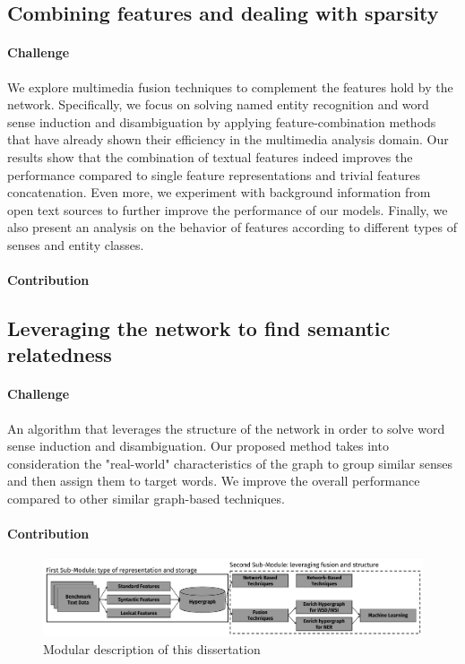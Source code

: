 \subsection{Combining features and dealing with sparsity}
\paragraph{Challenge}

 We explore multimedia fusion techniques to complement the features hold by the network. Specifically, we focus on solving named entity recognition and word sense induction and disambiguation by applying feature-combination methods that have already shown their efficiency in the multimedia analysis domain.  Our results show that the combination of textual features indeed improves the performance compared to single feature representations and trivial features concatenation. Even more, we experiment with background information from open text sources to further improve the performance of our models. Finally, we also present an analysis on the behavior of features according to different types of senses and entity classes.



\paragraph{Contribution}
\newpage
\subsection{Leveraging the network to find semantic relatedness}
\paragraph{Challenge}
An algorithm that leverages  the structure of the network in order to solve word sense induction and disambiguation. Our proposed method takes into consideration the "real-world" characteristics of the graph to group similar senses and then assign them to target words. We  improve the overall performance compared to other similar graph-based techniques.

\paragraph{Contribution}






\begin{figure}
\centering
\includegraphics[width=1\linewidth]{./images/Chapitre1/main_diag2.pdf}
\caption{Modular description of this dissertation}
\label{fig:maindiag}
\end{figure}






